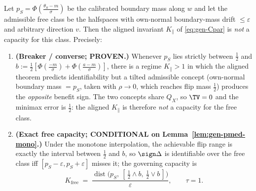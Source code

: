 \begin{theorem}\label{thm:gen-free}
Let $p_S=\Phi(\tfrac{\theta_S-m}{\sigma})$ be the calibrated boundary mass along $w$
and let the admissible free class be the halfspaces with own-normal boundary-mass
drift $\le\varepsilon$ and arbitrary direction $v$. Then the aligned invariant
$K_\parallel$ of \eqref{eq:gen-Cpar} is \emph{not} a capacity for this class. Precisely:
\begin{enumerate}\itemsep1pt
\item[\textnormal{(i)}] \textbf{(Breaker / converse; PROVEN.)} Whenever $p_S$ lies
strictly between $\tfrac12$ and $b:=\tfrac12[\Phi(\tfrac{-m}{\sigma})+\Phi(\tfrac{a-m}{\sigma})]$,
there is a regime $K_\parallel>1$ in which the aligned theorem predicts identifiability
but a tilted admissible concept (own-normal boundary mass $=p_S$, taken with
$\rho\to0$, which reaches flip mass $\tfrac12$) produces the \emph{opposite} benefit
sign. The two concepts share $Q_X$, so $\TV=0$ and the minimax error is $\tfrac12$: the
aligned $K_\parallel$ is therefore \emph{not} a capacity for the free class.
\item[\textnormal{(ii)}] \textbf{(Exact free capacity; CONDITIONAL on
Lemma~\ref{lem:gen-pmed-mono}.)} Under the monotone interpolation, the achievable flip
range is exactly the interval between $\tfrac12$ and $b$, so $\sign\Delta$ is identifiable
over the free class iff $[p_S-\varepsilon,p_S+\varepsilon]$ misses it; the governing
capacity is
\[
  K_{\mathrm{free}}\;=\;\frac{\operatorname{dist}\!\big(p_S,\ [\,\tfrac12\wedge b,\ \tfrac12\vee b\,]\big)}{\varepsilon},
  \qquad \tau=1 .
\]
\end{enumerate}
\end{theorem}
